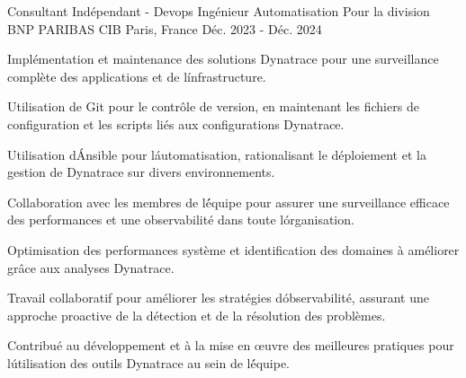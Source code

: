 
\begin{cventries}

  \cventry
    {Consultant Indépendant - Devops Ingénieur Automatisation}  %
    {Pour la division BNP PARIBAS CIB} %
    {Paris, France} %
    {Déc. 2023 - Déc. 2024} %
    {
      \begin{cvitems} %
        \item {Implémentation et maintenance des solutions Dynatrace pour une surveillance complète des applications et de l\' infrastructure.}
        \item {Utilisation de Git pour le contrôle de version, en maintenant les fichiers de configuration et les scripts liés aux configurations Dynatrace.}
        \item {Utilisation d\' Ansible pour l\' automatisation, rationalisant le déploiement et la gestion de Dynatrace sur divers environnements.}
        \item {Collaboration avec les membres de l\' équipe pour assurer une surveillance efficace des performances et une observabilité dans toute l\' organisation.}
        \item {Optimisation des performances système et identification des domaines à améliorer grâce aux analyses Dynatrace.}
        \item {Travail collaboratif pour améliorer les stratégies d\' observabilité, assurant une approche proactive de la détection et de la résolution des problèmes.}
        \item {Contribué au développement et à la mise en œuvre des meilleures pratiques pour l\' utilisation des outils Dynatrace au sein de l\' équipe.}
      \end{cvitems}
    }



\end{cventries}
